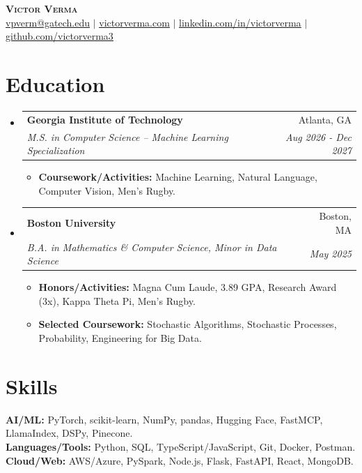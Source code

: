 \documentclass[letterpaper,11pt]{article}
\makeatletter
\newcommand{\resumeItem}[1]{
  \item\small{
    {#1 \vspace{-2pt}}
  }
}
\newcommand{\resumeSubheading}[4]{
  \vspace{-2pt}\item
    \begin{tabular*}{0.97\textwidth}[t]{l@{\extracolsep{\fill}}r}
      \textbf{#1} & #2 \\
      \textit{\small#3} & \textit{\small #4} \\
    \end{tabular*}\vspace{-7pt}
}
\newcommand{\resumeSubHeadingListStart}{\begin{itemize}[leftmargin=0.15in, label={}]}
\newcommand{\resumeSubHeadingListEnd}{\end{itemize}}
\newcommand{\resumeItemListStart}{\begin{itemize}}
\newcommand{\resumeItemListEnd}{\end{itemize}\vspace{-5pt}}
\makeatother
\begin{document}
\begin{center}
    \textbf{\Large \scshape Victor Verma} \\ \vspace{1pt}
    \href{mailto:vpverm@gatech.edu}{\underline{vpverm@gatech.edu}} $|$ 
    \href{https://www.victorverma.com}{\underline{victorverma.com}} $|$ 
    \href{https://linkedin.com/in/victorverma/}{\underline{linkedin.com/in/victorverma}} $|$
    \href{https://github.com/victorverma3}{\underline{github.com/victorverma3}}
\end{center}


\section{Education}
  \resumeSubHeadingListStart
    \resumeSubheading
      {Georgia Institute of Technology}{Atlanta, GA}
      {M.S. in Computer Science \--- Machine Learning Specialization}{Aug 2026 - Dec 2027}
      \resumeItemListStart
        \resumeItem{\textbf{Coursework/Activities:} Machine Learning, Natural Language, Computer Vision, Men's Rugby.}
      \resumeItemListEnd

    \resumeSubheading
      {Boston University}{Boston, MA}
      {B.A. in Mathematics \& Computer Science, Minor in Data Science}{May 2025}
      \resumeItemListStart
        \resumeItem{\textbf{Honors/Activities:} Magna Cum Laude, 3.89 GPA, Research Award (3x), Kappa Theta Pi, Men’s Rugby.}
        \resumeItem{\textbf{Selected Coursework:} Stochastic Algorithms, Stochastic Processes, Probability, Engineering for Big Data.}
      \resumeItemListEnd
  \resumeSubHeadingListEnd
  
\section{Skills}
 \begin{itemize}[leftmargin=0.15in, label={}]
    \small{\item{
     \textbf{AI/ML:}{ PyTorch, scikit-learn, NumPy, pandas, Hugging Face, FastMCP, LlamaIndex, DSPy, Pinecone.} \\
     \textbf{Languages/Tools:}{ Python, SQL, TypeScript/JavaScript, Git, Docker, Postman.} \\
     \textbf{Cloud/Web:}{ AWS/Azure, PySpark, Node.js, Flask, FastAPI, React, MongoDB.}
    }}
 \end{itemize}
\end{document}
